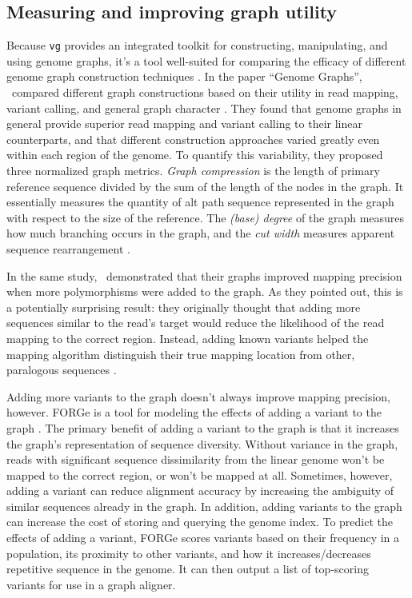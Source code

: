\subsection{Measuring and improving graph utility}

Because \texttt{vg} provides an integrated toolkit for constructing, manipulating, and using genome graphs, it's a tool well-suited for comparing the efficacy of different genome graph construction techniques \cite{Novak_2017, Garrison_2018}.
In the paper ``Genome Graphs'', \citeauthor{Novak_2017a}\ compared different graph constructions based on their utility in read mapping, variant calling, and general graph character \citep{Novak_2017a} .
They found that genome graphs in general provide superior read mapping and variant calling to their linear counterparts, and that different construction approaches varied greatly even within each region of the genome.
To quantify this variability, they proposed three normalized graph metrics.
 \emph{Graph compression} is the length of primary reference sequence divided by the sum of the length of the nodes in the graph.
It essentially measures the quantity of alt path sequence represented in the graph with respect to the size of the reference.
The \emph{(base) degree} of the graph measures how much branching occurs in the graph, and the \emph{cut width} measures apparent sequence rearrangement .

In the same study, \citeauthor{Novak_2017a}\ demonstrated that their graphs improved mapping precision when more polymorphisms were added to the graph.
As they pointed out, this is a potentially surprising result: they originally thought that adding more sequences similar to the read's target would reduce the likelihood of the read mapping to the correct region.
Instead, adding known variants helped the mapping algorithm distinguish their true mapping location from other, paralogous sequences \citep{Novak_2017a}.

Adding more variants to the graph doesn't always improve mapping precision, however.
FORGe is a tool for modeling the effects of adding a variant to the graph \cite{Pritt_2018}. 
The primary benefit of adding a variant to the graph is that it increases the graph's representation of sequence diversity.
Without variance in the graph, reads with significant sequence dissimilarity from the linear genome won't be mapped to the correct region, or won't be mapped at all.
Sometimes, however, adding a variant can reduce alignment accuracy by increasing the ambiguity of similar sequences already in the graph.
In addition, adding variants to the graph can increase the cost of storing and querying the genome index.
To predict the effects of adding a variant, FORGe scores variants based on their frequency in a population, its proximity to other variants, and how it increases/decreases repetitive sequence in the genome.
It can then output a list of top-scoring variants for use in a graph aligner.


